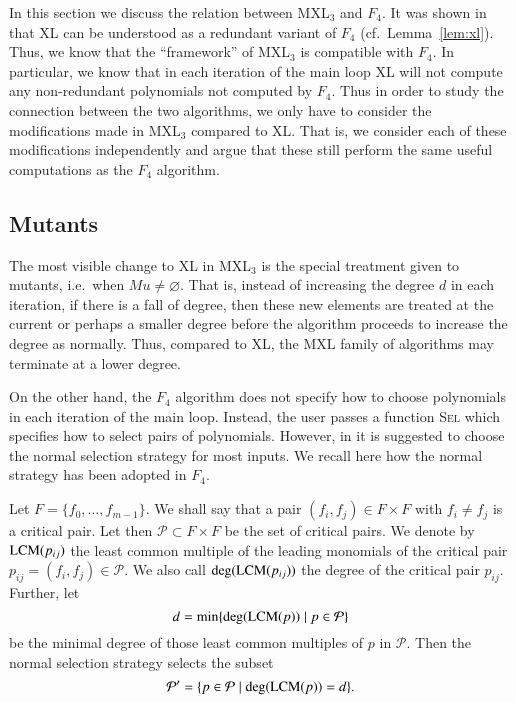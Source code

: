 In this section we discuss the relation between MXL$_3$ and $F_4$.  It was shown in \cite{DBLP:conf/asiacrypt/ArsFIKS04} that XL can be understood as a redundant variant of $F_4$ (cf.\ Lemma~\ref{lem:xl}).  Thus, we know that the ``framework'' of MXL$_3$ is compatible with $F_4$. In particular, we know that in each iteration of the main loop XL will not compute any non-redundant polynomials not computed by $F_4$. Thus in order to study the connection between the two algorithms, we only have to consider the modifications made in MXL$_3$ compared to XL. That is, we consider each of these modifications independently and argue that these still perform the same useful computations as the $F_4$ algorithm.

\subsection{Mutants}
The most visible change to XL in MXL$_3$ is the special treatment given to mutants, i.e.\ when $Mu\neq\varnothing$. That is, instead of increasing the degree $d$ in each iteration, if there is a fall of degree, 
then these new elements are treated at the current or perhaps a smaller degree before the algorithm proceeds to increase the degree as normally. Thus, compared to XL, the MXL family of algorithms may terminate at a lower degree. 

On the other hand, the $F_4$ algorithm does not specify how to choose polynomials in each iteration of the main loop. Instead, the user passes a function \textsc{Sel} which specifies how to select
pairs of polynomials. 
However, in \cite{F4} it is suggested to choose the normal selection strategy \cite[p. 225]{Becker1991} for most inputs. We recall here how the normal strategy has been adopted in $F_4$.   

\begin{definition}
Let $F=\{f_0,\dots,f_{m-1} \}$.
We shall say that a pair $(f_i,f_j) \in F \times F$ with $f_i \ne f_j$ is a critical pair. Let then $\mathcal{P} \subset F \times F $ be the set of critical pairs. We denote by $\textsc{LCM}(p_{ij})$ the least common multiple of the leading monomials of the critical pair $p_{ij} = (f_i,f_j) \in \mathcal{P}$. We also call $\deg(\textsc{LCM}(p_{ij}))$ the degree of the critical pair $p_{ij}$. Further, let $$d = \min\{\deg(\textsc{LCM}(p)) \mid  p \in \mathcal{P}\}$$ be the minimal degree of those least common multiples of $p$ in $\mathcal{P}$. Then the normal selection strategy selects the subset 
$$
\mathcal{P}' = \{ p \in \mathcal{P} \mid \deg(\textsc{LCM}(p))=d\}.
$$
\end{definition}

